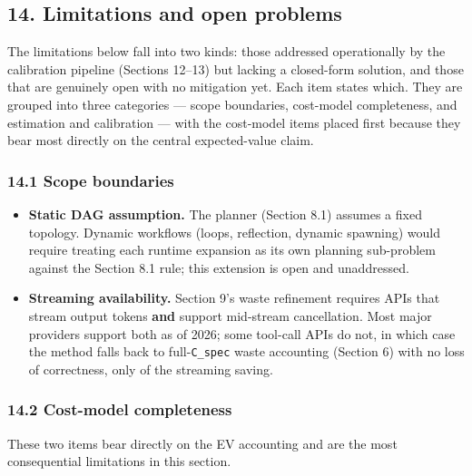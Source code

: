 \documentclass[
  11pt,
]{article}
\providecommand{\tightlist}{%
  \setlength{\itemsep}{0pt}\setlength{\parskip}{0pt}}
\begin{document}
\subsection{14. Limitations and open
problems}\label{limitations-and-open-problems}

The limitations below fall into two kinds: those addressed operationally
by the calibration pipeline (Sections 12--13) but lacking a closed-form
solution, and those that are genuinely open with no mitigation yet. Each
item states which. They are grouped into three categories --- scope
boundaries, cost-model completeness, and estimation and calibration ---
with the cost-model items placed first because they bear most directly
on the central expected-value claim.

\subsubsection{14.1 Scope boundaries}\label{scope-boundaries}

\begin{itemize}
\tightlist
\item
  \textbf{Static DAG assumption.} The planner (Section 8.1) assumes a
  fixed topology. Dynamic workflows (loops, reflection, dynamic
  spawning) would require treating each runtime expansion as its own
  planning sub-problem against the Section 8.1 rule; this extension is
  open and unaddressed.
\item
  \textbf{Streaming availability.} Section 9's waste refinement requires
  APIs that stream output tokens \textbf{and} support mid-stream
  cancellation. Most major providers support both as of 2026; some
  tool-call APIs do not, in which case the method falls back to
  full-\texttt{C\_spec} waste accounting (Section 6) with no loss of
  correctness, only of the streaming saving.
\end{itemize}

\subsubsection{14.2 Cost-model
completeness}\label{cost-model-completeness}

These two items bear directly on the EV accounting and are the most
consequential limitations in this section.
\end{document}
